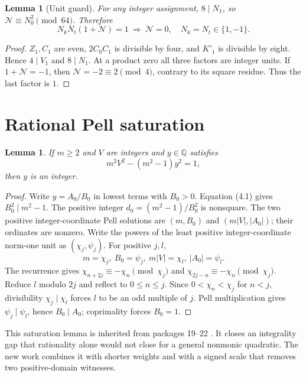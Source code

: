 \documentclass[11pt]{article}
\newtheorem{lemma}[theorem]{Lemma}
\theoremstyle{remark}\newtheorem{remark}[theorem]{Remark}
\begin{document}
\begin{lemma}[Unit guard]\label{lem:unit}
For any integer assignment, \(8\mid N_1\), so
\(\mathcal N\equiv N_0^2\pmod{64}\). Therefore
\[
N_kN_t(1+\mathcal N)=1
\ \Longrightarrow\ 
\mathcal N=0,\quad N_k=N_t\in\{1,-1\}.
\tag{3.6}
\]
\end{lemma}
\begin{proof}
\(Z_1,C_1\) are even, \(2C_0C_1\) is divisible by four,
and \(K'_1\) is divisible by eight. Hence \(4\mid V_1\)
and \(8\mid N_1\). At a product zero all three factors are integer
units. If \(1+\mathcal N=-1\), then \(\mathcal N=-2\equiv2\pmod4\),
contrary to its square residue. Thus the last factor is \(1\).
\end{proof}

\section{Rational Pell saturation}
\label{sec:saturation}

\begin{lemma}\label{lem:saturation}
If \(m\ge2\) and \(V\) are integers and \(y\in\mathbb Q\) satisfies
\[
m^2V^2-(m^2-1)y^2=1,
\tag{4.1}
\]
then \(y\) is an integer.
\end{lemma}
\begin{proof}
Write \(y=A_0/B_0\) in lowest terms with \(B_0>0\).
Equation (4.1) gives \(B_0^2\mid m^2-1\).
The positive integer \(d_0=(m^2-1)/B_0^2\) is nonsquare.
The two positive integer-coordinate Pell solutions are
\((m,B_0)\) and \((m|V|,|A_0|)\); their ordinates are nonzero.
Write the powers of the least positive integer-coordinate norm-one
unit as \((\chi_j,\psi_j)\). For positive \(j,l\),
\[
m=\chi_j,\ B_0=\psi_j,\ m|V|=\chi_l,\ |A_0|=\psi_l.
\]
The recurrence gives
\(\chi_{n+2j}\equiv-\chi_n\pmod{\chi_j}\) and
\(\chi_{2j-n}\equiv-\chi_n\pmod{\chi_j}\).
Reduce \(l\) modulo \(2j\) and reflect to \(0\le n\le j\).
Since \(0<\chi_n<\chi_j\) for \(n<j\), divisibility
\(\chi_j\mid\chi_l\) forces \(l\) to be an odd multiple of \(j\).
Pell multiplication gives \(\psi_j\mid\psi_l\), hence \(B_0\mid A_0\);
coprimality forces \(B_0=1\).
\end{proof}

This saturation lemma is inherited from packages 19--22
\cite{norm21,root20,monic22}. It closes an integrality gap that
rationality alone would not close for a general nonmonic quadratic.
The new work combines it with shorter weights and with a signed
scale that removes two positive-domain witnesses.
\end{document}
